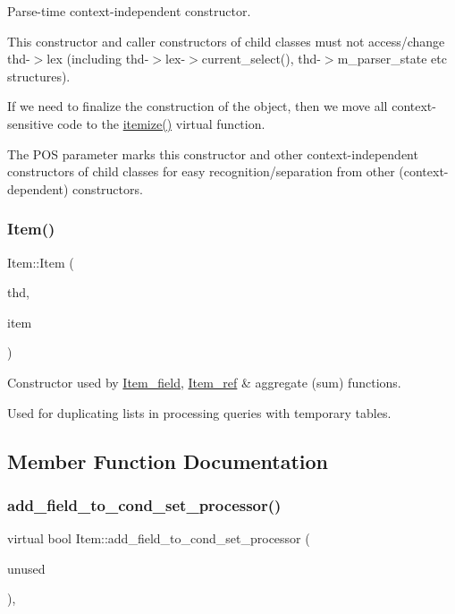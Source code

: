 Parse-\/time context-\/independent constructor.

This constructor and caller constructors of child classes must not access/change thd-\/$>$lex (including thd-\/$>$lex-\/$>$current\+\_\+select(), thd-\/$>$m\+\_\+parser\+\_\+state etc structures).

If we need to finalize the construction of the object, then we move all context-\/sensitive code to the \mbox{\hyperlink{classItem_a0757839d09aa77bfd92bfe071f257ae9}{itemize()}} virtual function.

The P\+OS parameter marks this constructor and other context-\/independent constructors of child classes for easy recognition/separation from other (context-\/dependent) constructors. \mbox{\label{classItem_ada77f843f657d3acbecf5f9fad69b440}} 
\subsubsection{\texorpdfstring{Item()}{Item()}\hspace{0.1cm}{\footnotesize\ttfamily [2/2]}}
{\footnotesize\ttfamily Item\+::\+Item (\begin{DoxyParamCaption}\item[{T\+HD $\ast$}]{thd,  }\item[{\mbox{\hyperlink{classItem}{Item}} $\ast$}]{item }\end{DoxyParamCaption})}

Constructor used by \mbox{\hyperlink{classItem__field}{Item\+\_\+field}}, \mbox{\hyperlink{classItem__ref}{Item\+\_\+ref}} \& aggregate (sum) functions.

Used for duplicating lists in processing queries with temporary tables. 

\subsection{Member Function Documentation}
\mbox{\label{classItem_a1ddf19c11395fc67c33b8bb38ce67fc7}} 
\subsubsection{\texorpdfstring{add\+\_\+field\+\_\+to\+\_\+cond\+\_\+set\+\_\+processor()}{add\_field\_to\_cond\_set\_processor()}}
{\footnotesize\ttfamily virtual bool Item\+::add\+\_\+field\+\_\+to\+\_\+cond\+\_\+set\+\_\+processor (\begin{DoxyParamCaption}\item[{uchar $\ast$}]{unused }\end{DoxyParamCaption})\hspace{0.3cm}{\ttfamily [inline]}, {\ttfamily [virtual]}}

